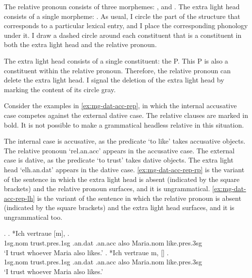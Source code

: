 The relative pronoun consists of three morphemes: ,  and .
The extra light head consists of a single morpheme: .
As usual, I circle the part of the structure that corresponds to a particular lexical entry, and I place the corresponding phonology under it.
I draw a dashed circle around each constituent that is a constituent in both the extra light head and the relative pronoun.

The extra light head consists of a single constituent: the P.
This P is also a constituent within the relative pronoun. Therefore, the relative pronoun can delete the extra light head. I signal the deletion of the extra light head by marking the content of its circle gray.

Consider the examples in \ref{ex:mg-dat-acc-rep}, in which the internal accusative case competes against the external dative case. The relative clauses are marked in bold. It is not possible to make a grammatical headless relative in this situation.

The internal case is accusative, as the predicate  `to like' takes accusative objects. The relative pronoun  `\ac{rel}.\ac{an}.\ac{acc}' appears in the accusative case.
The external case is dative, as the predicate  `to trust' takes dative objects. The extra light head  `\ac{elh}.\ac{an}.\ac{dat}' appears in the dative case.
\ref{ex:mg-dat-acc-rep-rp} is the variant of the sentence in which the extra light head is absent (indicated by the square brackets) and the relative pronoun surfaces, and it is ungrammatical.
\ref{ex:mg-dat-acc-rep-lh} is the variant of the sentence in which the relative pronoun is absent (indicated by the square brackets) and the extra light head surfaces, and it is ungrammatical too.

\ex.\label{ex:mg-dat-acc-rep}
\ag. *Ich vertraue [m],    .\\
1\ac{sg}.\ac{nom} trust.\ac{pres}.1\ac{sg}\scsub{[dat]} .\ac{an}.\ac{dat} .\ac{an}.\ac{acc} also Maria.\ac{nom} like.\ac{pres}.3\ac{sg}\scsub{[acc]}\\
`I trust whoever Maria also likes.' \label{ex:mg-dat-acc-rep-rp}
\bg. *Ich vertraue m, []   .\\
1\ac{sg}.\ac{nom} trust.\ac{pres}.1\ac{sg}\scsub{[dat]} .\ac{an}.\ac{dat} .\ac{an}.\ac{acc} also Maria.\ac{nom} like.\ac{pres}.3\ac{sg}\scsub{[acc]}\\
`I trust whoever Maria also likes.' \label{ex:mg-dat-acc-rep-lh}

